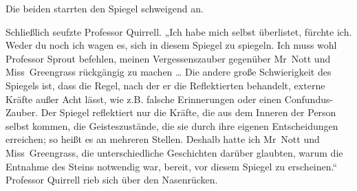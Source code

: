 Die beiden starrten den Spiegel schweigend an.

Schließlich seufzte Professor Quirrell.
„Ich habe mich selbst überlistet, fürchte ich. Weder du noch ich wagen es, sich in diesem Spiegel zu spiegeln. Ich muss wohl Professor Sprout befehlen, meinen Vergessenszauber gegenüber Mr~Nott und Miss~Greengrass rückgängig zu machen … Die andere große Schwierigkeit des Spiegels ist, dass die Regel, nach der er die Reflektierten behandelt, externe Kräfte außer Acht lässt, wie z.B. falsche Erinnerungen oder einen Confundus-Zauber. Der Spiegel reflektiert nur die Kräfte, die aus dem Inneren der Person selbst kommen, die Geisteszustände, die sie durch ihre eigenen Entscheidungen erreichen; so heißt es an mehreren Stellen. Deshalb hatte ich Mr~Nott und Miss~Greengrass, die unterschiedliche Geschichten darüber glaubten, warum die Entnahme des Steins notwendig war, bereit, vor diesem Spiegel zu erscheinen.“
Professor Quirrell rieb sich über den Nasenrücken.

